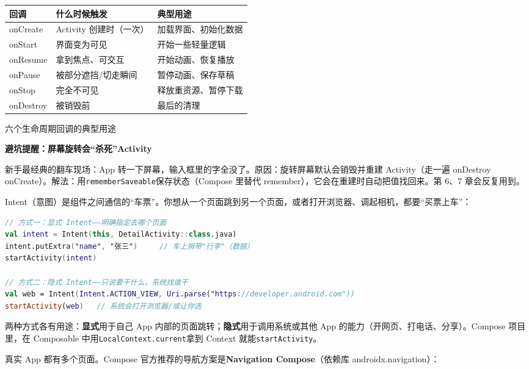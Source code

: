 \begin{center}
\begin{tabularx}{\linewidth}{|X|X|X|}
\hline
\textbf{回调} & \textbf{什么时候触发} & \textbf{典型用途} \tabularnewline
\hline
onCreate & Activity 创建时（一次） & 加载界面、初始化数据 \tabularnewline
onStart & 界面变为可见 & 开始一些轻量逻辑 \tabularnewline
onResume & 拿到焦点、可交互 & 开始动画、恢复播放 \tabularnewline
onPause & 被部分遮挡/切走瞬间 & 暂停动画、保存草稿 \tabularnewline
onStop & 完全不可见 & 释放重资源、暂停下载 \tabularnewline
onDestroy & 被销毁前 & 最后的清理 \tabularnewline
\hline
\end{tabularx}
\end{center}

\begin{center}\small\color{gray}六个生命周期回调的典型用途\end{center}

\textbf{避坑提醒：屏幕旋转会“杀死”Activity}\par

新手最经典的翻车现场：App 转一下屏幕，输入框里的字全没了。原因：旋转屏幕默认会销毁并重建 Activity（走一遍 onDestroy onCreate）。解法：用\texttt{rememberSaveable}保存状态（Compose 里替代 remember），它会在重建时自动把值找回来。第 6、7 章会反复用到。


Intent（意图）是组件之间通信的“车票”。你想从一个页面跳到另一个页面，或者打开浏览器、调起相机，都要“买票上车”：

\begin{lstlisting}[language=Kotlin]
// 方式一：显式 Intent——明确指定去哪个页面
val intent = Intent(this, DetailActivity::class.java)
intent.putExtra("name", "张三")     // 车上捎带"行李"（数据）
startActivity(intent)

// 方式二：隐式 Intent——只说要干什么，系统找谁干
val web = Intent(Intent.ACTION_VIEW, Uri.parse("https://developer.android.com"))
startActivity(web)   // 系统会打开浏览器/或让你选
\end{lstlisting}

两种方式各有用途：\textbf{显式}用于自己 App 内部的页面跳转；\textbf{隐式}用于调用系统或其他 App 的能力（开网页、打电话、分享）。Compose 项目里，在 Composable 中用\texttt{LocalContext.\allowbreak current}拿到 Context 就能\texttt{startActivity}。


真实 App 都有多个页面。Compose 官方推荐的导航方案是\textbf{Navigation Compose}（依赖库 androidx.navigation）：

